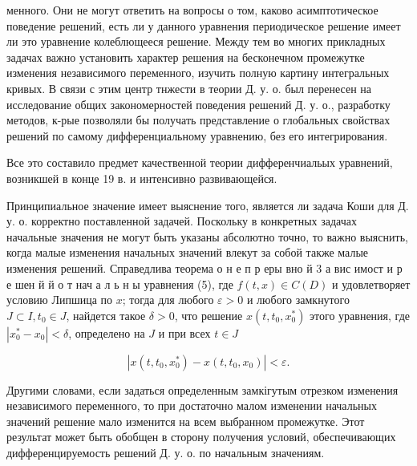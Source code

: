 \documentclass[10pt]{article}
\begin{document}
менного. Они не могут ответить на вопросы о том, каково асимптотическое поведение решений, есть ли у данного уравнения периодическое решение имеет ли это уравнение колеблющееся решение. Между тем во многих прикладных задачах важно установить характер решения на бесконечном промежутке изменения независимого переменного, изучить полную картину интегральных кривых. В связи с этим центр тнжести в теории Д. у. о. был перенесен на исследование общих закономерностей поведения решений Д. у. о., разработку методов, к-рые позволяли бы получать представление о глобальных свойствах решений по самому дифференциальному уравнению, без его интегрирования.



Все это составило предмет качественной теории дифференчиальых уравнений, возникшей в конце 19 в. и интенсивно развивающейся.



Принципиальное значение имеет выяснение того, является ли задача Коши для Д. у. о. корректно поставленной задачей. Поскольку в конкретных задачах начальные значения не могут быть указаны абсолютно точно, то важно выяснить, когда малые изменения начальных значений влекут за собой также малые изменения решений. Справедлива теорема о н е п р еры вно й 3 а вис имост и р е шен й й о т нач а л ь н ы уравнения (5), где $f(t, x) \in C(D)$ и удовлетворяет условию Липшица по $x$; тогда для любого $\varepsilon>0$ и любого замкнутого $J \subset I, t_{0} \in J$, найдется такое $\delta>0$, что решение $x\left(t, t_{0}, x_{0}^{*}\right)$ этого уравнения, где $\left|x_{0}^{*}-x_{0}\right|<\delta$, определено на $J$ и при всех $t \in J$



\[

\left|x\left(t, t_{0}, x_{0}^{*}\right)-x\left(t, t_{0}, x_{0}\right)\right|<\varepsilon .

\]



Другими словами, если задаться определенным замкігутым отрезком изменения независимого переменного, то при достаточно малом изменении начальных значений решение мало изменится на всем выбранном промежутке. Этот результат может быть обобщен в сторону получения условий, обеспечивающих дифференцируемость решений Д. у. о. по начальным значениям.
\end{document}
